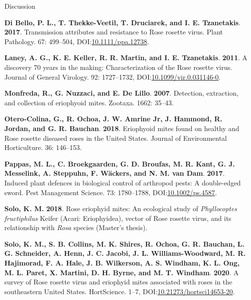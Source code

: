 \documentclass[
  ignorenonframetext,
]{beamer}
\newlength{\cslhangindent}
\newlength{\cslentryspacingunit} %
\newenvironment{CSLReferences}[2] %
 {%
  \setlength{\parindent}{0pt}
  \ifodd #1
  \let\oldpar\par
  \def\par{\hangindent=\cslhangindent\oldpar}
  \fi
  \setlength{\parskip}{#2\cslentryspacingunit}
 }%
 {}
\begin{document}
\begin{frame}{Discussion}
\begin{CSLReferences}{1}{0}
\leavevmode{}%
\textbf{Di Bello, P. L., T. Thekke-Veetil, T. Druciarek, and I. E.
Tzanetakis}. \textbf{2017}. Transmission attributes and resistance to
{Rose rosette virus}. Plant Pathology. 67: 499--504,
DOI:\href{https://doi.org/10.1111/ppa.12738}{10.1111/ppa.12738}.

\leavevmode{}%
\textbf{Laney, A. G., K. E. Keller, R. R. Martin, and I. E. Tzanetakis}.
\textbf{2011}. A discovery 70 years in the making: Characterization of
the {Rose rosette virus}. Journal of General Virology. 92: 1727--1732,
DOI:\href{https://doi.org/10.1099/vir.0.031146-0}{10.1099/vir.0.031146-0}.

\leavevmode{}%
\textbf{Monfreda, R., G. Nuzzaci, and E. De Lillo}. \textbf{2007}.
Detection, extraction, and collection of eriophyoid mites. Zootaxa.
1662: 35--43.

\leavevmode{}%
\textbf{Otero-Colina, G., R. Ochoa, J. W. Amrine Jr, J. Hammond, R.
Jordan, and G. R. Bauchan}. \textbf{2018}. Eriophyoid mites found on
healthy and {Rose rosette diseased} roses in the {United States}.
Journal of Environmental Horticulture. 36: 146--153.

\leavevmode{}%
\textbf{Pappas, M. L., C. Broekgaarden, G. D. Broufas, M. R. Kant, G. J.
Messelink, A. Steppuhn, F. Wäckers, and N. M. van Dam}. \textbf{2017}.
Induced plant defences in biological control of arthropod pests: A
double-edged sword. Pest Management Science. 73: 1780--1788,
DOI:\href{https://doi.org/10.1002/ps.4587}{10.1002/ps.4587}.

\leavevmode{}%
\textbf{Solo, K. M.} \textbf{2018}. Rose eriophyid mites: An ecological
study of {\emph{Phyllocoptes fructiphilus}} {Keifer} {({Acari}:
{Eriophyidea})}, vector of {Rose rosette virus}, and its relationship
with {\emph{Rosa}} species (Master's thesis).

\leavevmode{}%
\textbf{Solo, K. M., S. B. Collins, M. K. Shires, R. Ochoa, G. R.
Bauchan, L. G. Schneider, A. Henn, J. C. Jacobi, J. L.
Williams-Woodward, M. R. Hajimorad, F. A. Hale, J. B. Wilkerson, A. S.
Windham, K. L. Ong, M. L. Paret, X. Martini, D. H. Byrne, and M. T.
Windham}. \textbf{2020}. A survey of {Rose rosette virus} and eriophyid
mites associated with roses in the southeastern {United States}.
{HortScience}. 1--7,
DOI:\href{https://doi.org/10.21273/hortsci14653-20}{10.21273/hortsci14653-20}.


\end{CSLReferences}
\end{frame}
\end{document}
